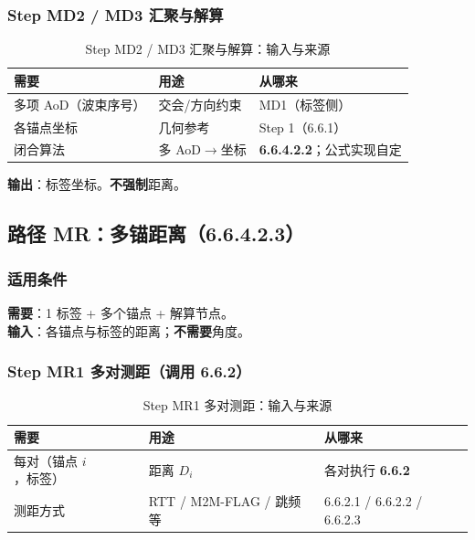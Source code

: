 \documentclass[11pt,a4paper]{ctexart}
\begin{document}
\subsubsection{Step MD2 / MD3 汇聚与解算}

\begin{longtable}{L{3.4cm}L{4.8cm}L{4.8cm}}
\caption{Step MD2 / MD3 汇聚与解算：输入与来源\label{tab:step132}} \\
\toprule
\textbf{需要} & \textbf{用途} & \textbf{从哪来} \\
\midrule
多项 AoD（波束序号） & 交会/方向约束 & MD1（标签侧） \\
各锚点坐标 & 几何参考 & Step 1（6.6.1） \\
闭合算法 & 多 AoD$\rightarrow$坐标 & \textbf{6.6.4.2.2}；公式实现自定 \\
\bottomrule
\end{longtable}

\textbf{输出}：标签坐标。\textbf{不强制}距离。

\subsection{路径 MR：多锚距离（6.6.4.2.3）}
\label{sec:mr}

\subsubsection{适用条件}

\textbf{需要}：1 标签 + 多个锚点 + 解算节点。\\
\textbf{输入}：各锚点与标签的距离；\textbf{不需要}角度。

\subsubsection{Step MR1 多对测距（调用 6.6.2）}

\begin{longtable}{L{3.4cm}L{4.8cm}L{4.8cm}}
\caption{Step MR1 多对测距：输入与来源\label{tab:step133}} \\
\toprule
\textbf{需要} & \textbf{用途} & \textbf{从哪来} \\
\midrule
每对（锚点 $i$，标签） & 距离 $D_i$ & 各对执行 \textbf{6.6.2} \\
测距方式 & RTT / M2M-FLAG / 跳频等 & 6.6.2.1 / 6.6.2.2 / 6.6.2.3 \\
\bottomrule
\end{longtable}
\end{document}
